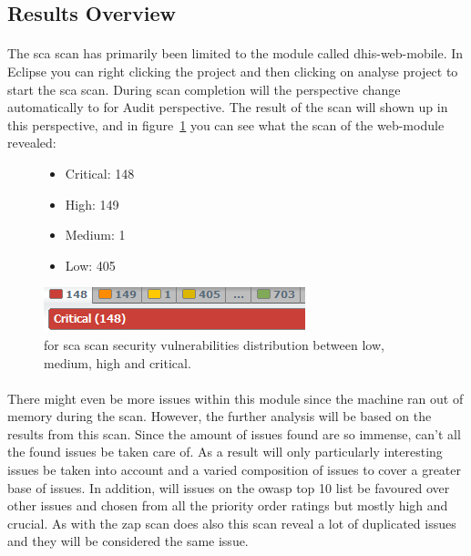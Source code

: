 \documentclass[11pt,english,a4paper]{report}
\begin{document}
\subsection{Results Overview}
\paragraph{}
The \gls{sca} scan has primarily been limited to the module called dhis-web-mobile. In Eclipse you can right clicking the project and then clicking on analyse project to start the \gls{sca} scan.
During scan completion will the perspective change automatically to \gls{for} Audit perspective.
The result of the scan will shown up in this perspective, and in figure~\ref{fig:issuesfoundmobilemodule} you can see what the scan of the web-module revealed:

\begin{figure}[ht]
\RawFloats
    \begin{minipage}[b]{0.48\linewidth}
        \begin{itemize}
			\item Critical: 148
			\item High: 149
			\item Medium: 1
			\item Low: 405
		\end{itemize}
    \end{minipage}
    \hfill
    \begin{minipage}[b]{0.48\linewidth}
	    \centering
	    \includegraphics[scale=0.65]{images/foundissues.png}
	    \caption{\gls{for} \gls{sca} scan security vulnerabilities distribution between low, medium, high and critical. }
    	\label{fig:issuesfoundmobilemodule}
    \end{minipage}
\end{figure}

\paragraph{}
There might even be more issues within this module since the machine ran out of memory during the scan.
However, the further analysis will be based on the results from this scan.
Since the amount of issues found are so immense, can't all the found issues be taken care of. 
As a result will only particularly interesting issues be taken into account and a varied composition of issues to cover a greater base of issues.
In addition, will issues on the \gls{owasp} top 10 list be favoured over other issues and chosen from all the priority order ratings but mostly high and crucial.
As with the \gls{zap} scan does also this scan reveal a lot of duplicated issues and they will be considered the same issue.
\end{document}
